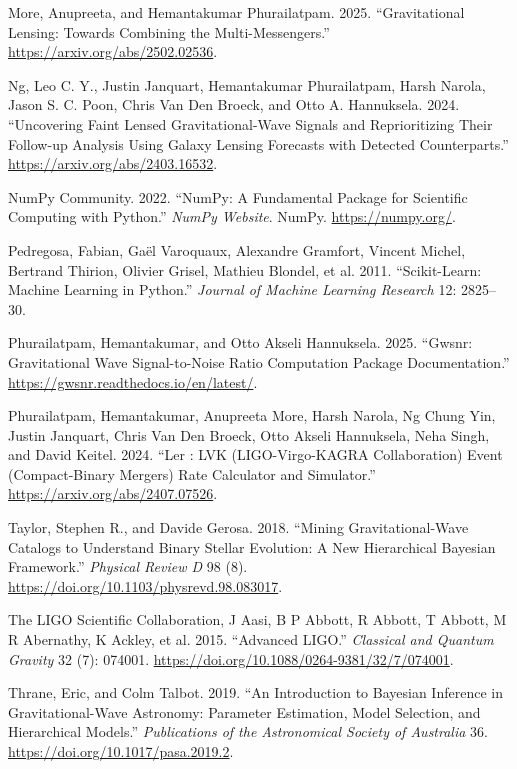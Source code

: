 \documentclass[10pt,a4paper,onecolumn]{article}
\newlength{\cslhangindent}
\newenvironment{CSLReferences}[3] %
 {%
  \setlength{\parindent}{0pt}
  \ifodd #1 \everypar{\setlength{\hangindent}{\cslhangindent}}\ignorespaces\fi
  \ifnum #2 > 0
  \setlength{\parskip}{#2\baselineskip}
  \fi
 }%
 {}
\begin{document}
\begin{CSLReferences}{1}{0}
\bibitem[\citeproctext]{ref-More:2025}
More, Anupreeta, and Hemantakumar Phurailatpam. 2025. {``Gravitational
Lensing: Towards Combining the Multi-Messengers.''}
\url{https://arxiv.org/abs/2502.02536}.

Ng, Leo C. Y., Justin Janquart, Hemantakumar Phurailatpam, Harsh Narola,
Jason S. C. Poon, Chris Van Den Broeck, and Otto A. Hannuksela. 2024.
{``Uncovering Faint Lensed Gravitational-Wave Signals and Reprioritizing
Their Follow-up Analysis Using Galaxy Lensing Forecasts with Detected
Counterparts.''} \url{https://arxiv.org/abs/2403.16532}.

NumPy Community. 2022. {``NumPy: A Fundamental Package for Scientific
Computing with Python.''} \emph{NumPy Website}. NumPy.
\url{https://numpy.org/}.

Pedregosa, Fabian, Gaël Varoquaux, Alexandre Gramfort, Vincent Michel,
Bertrand Thirion, Olivier Grisel, Mathieu Blondel, et al. 2011.
{``Scikit-Learn: Machine Learning in {P}ython.''} \emph{Journal of
Machine Learning Research} 12: 2825--30.

Phurailatpam, Hemantakumar, and Otto Akseli Hannuksela. 2025. {``Gwsnr:
Gravitational Wave Signal-to-Noise Ratio Computation Package
Documentation.''} \url{https://gwsnr.readthedocs.io/en/latest/}.

Phurailatpam, Hemantakumar, Anupreeta More, Harsh Narola, Ng Chung Yin,
Justin Janquart, Chris Van Den Broeck, Otto Akseli Hannuksela, Neha
Singh, and David Keitel. 2024. {``Ler : LVK (LIGO-Virgo-KAGRA
Collaboration) Event (Compact-Binary Mergers) Rate Calculator and
Simulator.''} \url{https://arxiv.org/abs/2407.07526}.

Taylor, Stephen R., and Davide Gerosa. 2018. {``Mining
Gravitational-Wave Catalogs to Understand Binary Stellar Evolution: A
New Hierarchical Bayesian Framework.''} \emph{Physical Review D} 98 (8).
\url{https://doi.org/10.1103/physrevd.98.083017}.

The LIGO Scientific Collaboration, J Aasi, B P Abbott, R Abbott, T
Abbott, M R Abernathy, K Ackley, et al. 2015. {``Advanced LIGO.''}
\emph{Classical and Quantum Gravity} 32 (7): 074001.
\url{https://doi.org/10.1088/0264-9381/32/7/074001}.

Thrane, Eric, and Colm Talbot. 2019. {``An Introduction to Bayesian
Inference in Gravitational-Wave Astronomy: Parameter Estimation, Model
Selection, and Hierarchical Models.''} \emph{Publications of the
Astronomical Society of Australia} 36.
\url{https://doi.org/10.1017/pasa.2019.2}.


\end{CSLReferences}
\end{document}
